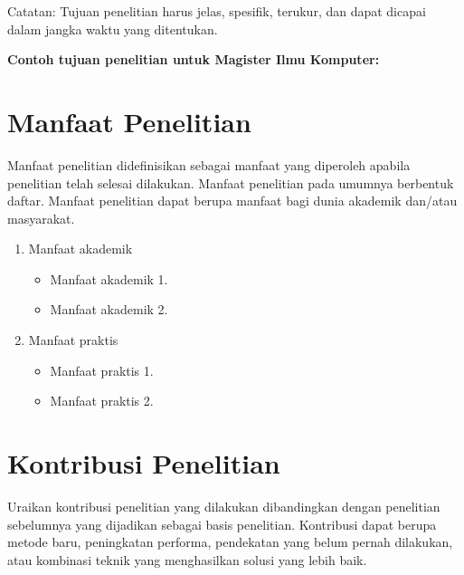 \noindent Catatan: Tujuan penelitian harus jelas, spesifik, terukur, dan dapat dicapai dalam jangka waktu yang ditentukan.

\vspace{5mm}
\noindent\textbf{Contoh tujuan penelitian untuk Magister Ilmu Komputer:} \\
\noindent{}

\section{Manfaat Penelitian}

Manfaat penelitian didefinisikan sebagai manfaat yang diperoleh apabila penelitian telah selesai dilakukan. Manfaat penelitian pada umumnya berbentuk daftar. Manfaat penelitian dapat berupa manfaat bagi dunia akademik dan/atau masyarakat.

\begin{enumerate}
	\item Manfaat akademik
	\begin{itemize}
		\item Manfaat akademik 1.
		\item Manfaat akademik 2.
	\end{itemize}
	\item Manfaat praktis
	\begin{itemize}
		\item Manfaat praktis 1.
		\item Manfaat praktis 2.
	\end{itemize}
\end{enumerate}

\section{Kontribusi Penelitian}

Uraikan kontribusi penelitian yang dilakukan dibandingkan dengan penelitian sebelumnya yang dijadikan sebagai basis penelitian. Kontribusi dapat berupa metode baru, peningkatan performa, pendekatan yang belum pernah dilakukan, atau kombinasi teknik yang menghasilkan solusi yang lebih baik.
